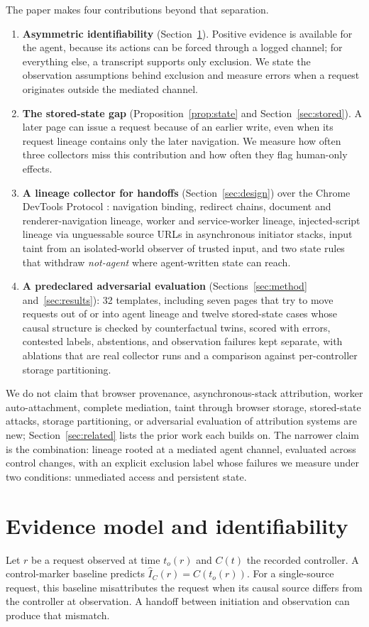 \documentclass[11pt]{article}
\theoremstyle{definition}
\begin{document}
The paper makes four contributions beyond that separation.
\begin{enumerate}
\item \textbf{Asymmetric identifiability} (Section~\ref{sec:model}). Positive
evidence is available for the agent, because its actions can be forced through a
logged channel; for everything else, a transcript supports only exclusion. We
state the observation assumptions behind exclusion and measure errors when a request originates outside the mediated channel.
\item \textbf{The stored-state gap} (Proposition~\ref{prop:state} and Section~\ref{sec:stored}).
A later page can issue a request because of an earlier write, even when its request
lineage contains only the later navigation. We measure how often three collectors miss
this contribution and how often they flag human-only effects.
\item \textbf{A lineage collector for handoffs} (Section~\ref{sec:design}) over the
Chrome DevTools Protocol \cite{cdp}: navigation binding, redirect chains,
document and renderer-navigation lineage, worker and service-worker lineage,
injected-script lineage via unguessable source URLs in asynchronous initiator
stacks, input taint from an isolated-world observer of trusted input, and two
state rules that withdraw \emph{not-agent} where agent-written state can reach.
\item \textbf{A predeclared adversarial evaluation} (Sections~\ref{sec:method}
and~\ref{sec:results}): 32 templates, including seven pages that try to move
requests out of or into agent lineage and twelve stored-state cases whose causal
structure is checked by counterfactual twins, scored with errors, contested
labels, abstentions, and observation failures kept separate, with ablations that
are real collector runs and a comparison against per-controller storage
partitioning.
\end{enumerate}
We do not claim that browser provenance, asynchronous-stack attribution, worker
auto-attachment, complete mediation, taint through browser storage, stored-state
attacks, storage partitioning, or adversarial evaluation of attribution systems
are new; Section~\ref{sec:related} lists the prior work each builds on. The
narrower claim is the combination: lineage rooted at a mediated agent channel,
evaluated across control changes, with an explicit exclusion label whose failures we measure under two conditions: unmediated access and persistent state.

\section{Evidence model and identifiability}\label{sec:model}
Let $r$ be a request observed at time $t_o(r)$ and $C(t)$ the recorded controller.
A control-marker baseline predicts $\widehat I_C(r)=C(t_o(r))$. For a single-source request, this baseline misattributes the request when
its causal source differs from the controller at observation. A handoff
between initiation and observation can produce that mismatch.
\end{document}
